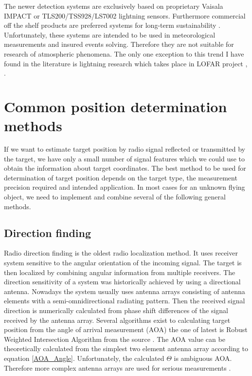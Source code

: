 \documentclass[twoside]{ctuthesis}
\theoremstyle{plain}
\theoremstyle{definition}
\theoremstyle{note}
\begin{document}
The newer detection systems are exclusively based on proprietary Vaisala  IMPACT \cite{IMPACT_sensor} or TLS200/TSS928/LS7002 lightning sensors. 
Furthermore commercial off the shelf products are preferred systems for long-term sustainability \cite{4DLSS}. Unfortunately, these systems are intended to be used in meteorological measurements and insured events solving. Therefore they are not suitable for research of atmospheric phenomena. The only one exception to this trend I have found in the literature is lightning research which takes place in LOFAR project \cite{LOFAR_lightning}, \cite{LOFAR_lightning2}.  

\section{Common position determination methods}

If we want to estimate target position by radio signal reflected or transmitted by the target, we have only a small number of signal features which we could use to obtain the information about target coordinates. The best method to be used for determination of target position depends on the target type, the measurement precision required and intended application. In most cases for an unknown flying object, we need to implement and combine several of the following general methods. 

\subsection{Direction finding}

Radio direction finding is the oldest radio localization method.  It uses receiver system sensitive to the angular orientation of the incoming signal.  The target is then localized by combining angular information from multiple receivers.  The direction sensitivity of a system was historically achieved by using a directional antenna. Nowadays the system usually uses antenna arrays consisting of antenna elements with a semi-omnidirectional radiating pattern. Then the received signal direction is numerically calculated from phase shift differences of the signal received by the antenna array. Several algorithms exist to calculating target position from the angle of arrival measurement (AOA) the one of latest is Robust Weighted Intersection Algorithm from the source \cite{RWIAOA}. The AOA value can be theoretically calculated from the simplest two element antenna array according to equation \ref{AOA_Angle}. Unfortunately, the calculated $\Theta$ is ambiguous AOA. Therefore more complex antenna arrays are used for serious measurements \cite{Interferometry_AOA}.  
\end{document}
